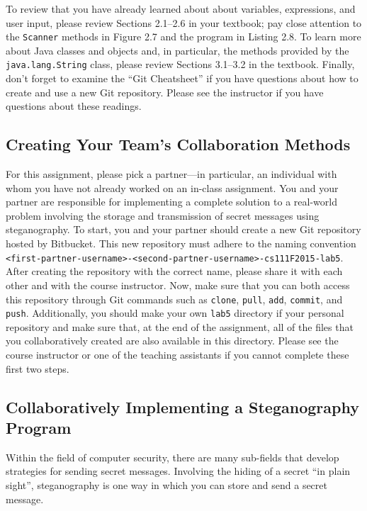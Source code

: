 To review that you have already learned about about variables, expressions, and user input, please review Sections
2.1--2.6 in your textbook; pay close attention to the {\tt Scanner} methods in Figure 2.7 and the program in Listing
2.8. To learn more about Java classes and objects and, in particular, the methods provided by the {\tt java.lang.String}
class, please review Sections 3.1--3.2 in the textbook. Finally, don't forget to examine the ``Git Cheatsheet'' if you
have questions about how to create and use a new Git repository. Please see the instructor if you have questions
about these readings.

\vspace{-0.05in}
\subsection*{Creating Your Team's Collaboration Methods}
\vspace{-0.05in}

For this assignment, please pick a partner---in particular, an individual with whom you have not already worked on an
in-class assignment. You and your partner are responsible for implementing a complete solution to a real-world problem
involving the storage and transmission of secret messages using steganography. To start, you and your partner should
create a new Git repository hosted by Bitbucket. This new repository must adhere to the naming convention {\tt
<first-partner-username>-<second-partner-username>-cs111F2015-lab5}. After creating the repository with the correct
name, please share it with each other and with the course instructor. Now, make sure that you can both access this
repository through Git commands such as {\tt clone}, {\tt pull}, {\tt add}, {\tt commit}, and {\tt push}. Additionally,
you should make your own {\tt lab5} directory if your personal repository and make sure that, at the end of the
assignment, all of the files that you collaboratively created are also available in this directory. Please see the
course instructor or one of the teaching assistants if you cannot complete these first two steps.

\subsection*{Collaboratively Implementing a Steganography Program}
\vspace{-0.05in}

Within the field of computer security, there are many sub-fields that develop strategies for sending secret messages.
Involving the hiding of a secret ``in plain sight'', steganography is one way in which you can store and send a secret
message.

